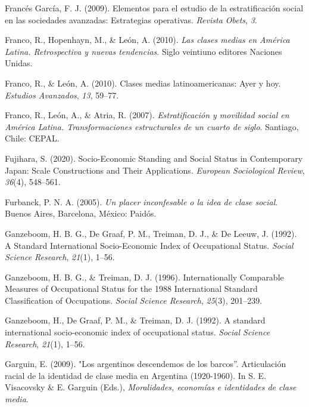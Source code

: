 \documentclass[
]{article}
\newlength{\cslhangindent}
\newlength{\cslentryspacingunit} %
\newenvironment{CSLReferences}[2] %
 {%
  \setlength{\parindent}{0pt}
  \ifodd #1
  \let\oldpar\par
  \def\par{\hangindent=\cslhangindent\oldpar}
  \fi
  \setlength{\parskip}{#2\cslentryspacingunit}
 }%
 {}
\begin{document}
\begin{CSLReferences}{1}{0}
\leavevmode{}%
Francés García, F. J. (2009). Elementos para el estudio de la estratificación social en las sociedades avanzadas: Estrategias operativas. \emph{Revista Obets}, \emph{3}.

\leavevmode{}%
Franco, R., Hopenhayn, M., \& León, A. (2010). \emph{Las clases medias en {América} {Latina}. {Retrospectiva} y nuevas tendencias}. Siglo veintiuno editores Naciones Unidas.

\leavevmode{}%
Franco, R., \& León, A. (2010). Clases medias latinoamericanas: Ayer y hoy. \emph{Estudios Avanzados}, \emph{13}, 59--77.

\leavevmode{}%
Franco, R., León, A., \& Atria, R. (2007). \emph{Estratificación y movilidad social en {América} {Latina}. {Transformaciones} estructurales de un cuarto de siglo}. Santiago, Chile: CEPAL.

\leavevmode{}%
Fujihara, S. (2020). Socio-{Economic} {Standing} and {Social} {Status} in {Contemporary} {Japan}: {Scale} {Constructions} and {Their} {Applications}. \emph{European Sociological Review}, \emph{36}(4), 548--561.

\leavevmode{}%
Furbanck, P. N. A. (2005). \emph{Un placer inconfesable o la idea de clase social}. Buenos Aires, Barcelona, México: Paidós.

\leavevmode{}%
Ganzeboom, H. B. G., De Graaf, P. M., Treiman, D. J., \& De Leeuw, J. (1992). A {Standard} {International} {Socio}-{Economic} {Index} of {Occupational} {Status}. \emph{Social Science Research}, \emph{21}(1), 1--56.

\leavevmode{}%
Ganzeboom, H. B. G., \& Treiman, D. J. (1996). Internationally {Comparable} {Measures} of {Occupational} {Status} for the 1988 {International} {Standard} {Classification} of {Occupations}. \emph{Social Science Research}, \emph{25}(3), 201--239.

\leavevmode{}%
Ganzeboom, H., De Graaf, P. M., \& Treiman, D. J. (1992). A standard international socio-economic index of occupational status. \emph{Social Science Research}, \emph{21}(1), 1--56.

\leavevmode{}%
Garguin, E. (2009). "{Los} argentinos descendemos de los barcos''. {Articulación} racial de la identidad de clase media en {Argentina} (1920-1960). In S. E. Visacovsky \& E. Garguin (Eds.), \emph{Moralidades, economías e identidades de clase media}.


\end{CSLReferences}
\end{document}
